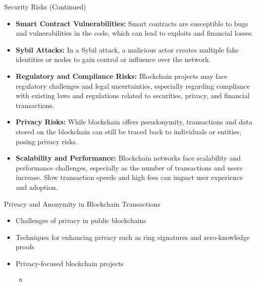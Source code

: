 \begin{frame}{Security Risks (Continued)}
    \begin{itemize}
    \item \textbf{Smart Contract Vulnerabilities:} Smart contracts are susceptible to bugs and vulnerabilities in the code, which can lead to exploits and financial losses.
    \item \textbf{Sybil Attacks:} In a Sybil attack, a malicious actor creates multiple fake identities or nodes to gain control or influence over the network.
    \item \textbf{Regulatory and Compliance Risks:} Blockchain projects may face regulatory challenges and legal uncertainties, especially regarding compliance with existing laws and regulations related to securities, privacy, and financial transactions.
    \item \textbf{Privacy Risks:} While blockchain offers pseudonymity, transactions and data stored on the blockchain can still be traced back to individuals or entities, posing privacy risks.
    \item \textbf{Scalability and Performance:} Blockchain networks face scalability and performance challenges, especially as the number of transactions and users increase. Slow transaction speeds and high fees can impact user experience and adoption.
    \end{itemize}
\end{frame}

\begin{frame}{Privacy and Anonymity in Blockchain Transactions}
    \begin{itemize}
        \item Challenges of privacy in public blockchains
        \item Techniques for enhancing privacy such as ring signatures and zero-knowledge proofs
        \item Privacy-focused blockchain projects
        \begin{itemize}
            \item 
        \end{itemize}
    \end{itemize}
\end{frame}


